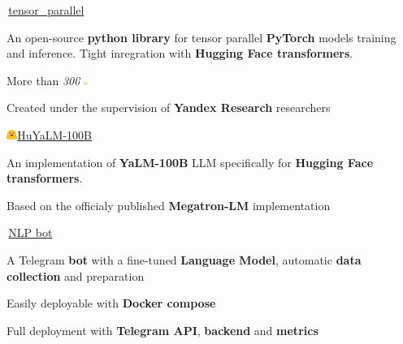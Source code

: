 
\begin{cventries}
  \cventry
    {} %
    {\,\faGithub\acvHeaderIconSep\href{https://github.com/BlackSamorez/tensor_parallel}{tensor\_parallel}} %
    {} %
    {} %
    {
      \begin{cvitems} %
        \item {An open-source \textbf{python library} for tensor parallel \textbf{PyTorch} models training and inference. Tight inregration with \textbf{Hugging Face transformers}.}
        \item {More than \textit{300}\includegraphics[width=3.5mm]{image.png}}
        \item {Created under the supervision of \textbf{Yandex Research} researchers}
      \end{cvitems}
    }

  \cventry
    {} %
    {\includegraphics[width=3.5mm]{hf.jpg}\acvHeaderIconSep\href{https://huggingface.co/BlackSamorez/HuYaLM-100B-fp16}{HuYaLM-100B}} %
    {} %
    {} %
    {
      \begin{cvitems} %
        \item {An implementation of \textbf{YaLM-100B} LLM specifically for \textbf{Hugging Face transformers}.}
        \item {Based on the officialy published \textbf{Megatron-LM} implementation}
      \end{cvitems}
    }
    
  \cventry
    {} %
    {\,\faGithub\acvHeaderIconSep\href{https://github.com/BlackSamorez/ebanko}{NLP bot}} %
    {} %
    {} %
    {
      \begin{cvitems} %
        \item {A Telegram \textbf{bot} with a fine-tuned \textbf{Language Model}, automatic \textbf{data collection} and preparation}
        \item {Easily deployable with \textbf{Docker compose}}
		\item {Full deployment with \textbf{Telegram API}, \textbf{backend} and \textbf{metrics}}
      \end{cvitems}
    }
    

\end{cventries}
